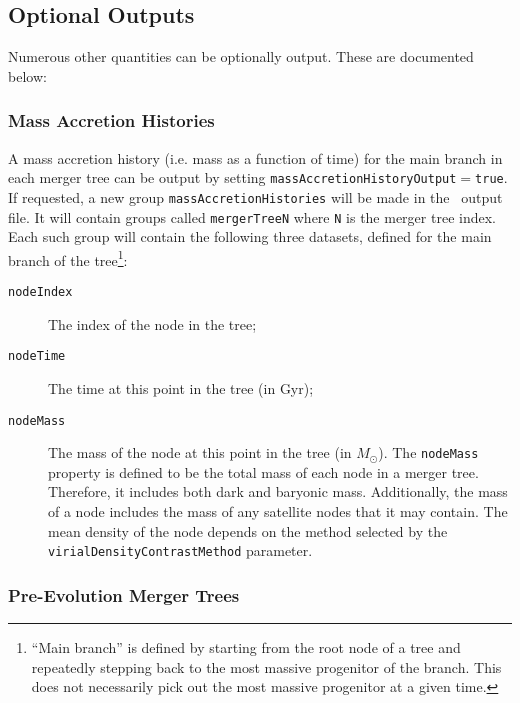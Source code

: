 \subsection{Optional Outputs}

Numerous other quantities can be optionally output. These are documented below:

\subsubsection{Mass Accretion Histories}

A mass accretion history (i.e. mass as a function of time) for the main branch in each merger tree can be output by setting {\tt massAccretionHistoryOutput}$=${\tt true}. If requested, a new group {\tt massAccretionHistories} will be made in the \glc\ output file. It will contain groups called {\tt mergerTreeN} where {\tt N} is the merger tree index. Each such group will contain the following three datasets, defined for the main branch of the tree\footnote{``Main branch'' is defined by starting from the root node of a tree and repeatedly stepping back to the most massive progenitor of the branch. This does not necessarily pick out the most massive progenitor at a given time.}:
\begin{description}
 \item [{\tt nodeIndex}] The index of the node in the tree;
 \item [{\tt nodeTime}] The time at this point in the tree (in Gyr);
 \item [{\tt nodeMass}] The mass of the node at this point in the tree (in $M_\odot$). The {\tt nodeMass} property is defined to be the total mass of each node in a merger tree. Therefore, it includes both dark and baryonic mass. Additionally, the mass of a node includes the mass of any satellite nodes that it may contain. The mean density of the node depends on the method selected by the {\tt virialDensityContrastMethod} parameter.
\end{description}

\subsubsection{Pre-Evolution Merger Trees}

